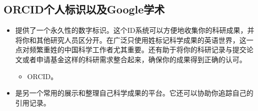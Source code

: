 \documentclass[letterpaper,10pt,english]{sphinxmanual}
\begin{document}
\subsection{ORCID个人标识以及Google学术}
\label{\detokenize{resource/research/getting_started_cn:orcidgoogle}}\begin{itemize}
\item {} 
提供了一个永久性的数字标识。这个ID系统可以方便地收集你的科研成果，并将你和其他研究人员区分开。在广泛只使用姓标记科学成果的英语世界，这一点对频繁重姓的中国科学工作者尤其重要。还有助于将你的科研记录与提交论文或者申请基金这样的科研需求整合起来，确保你的成果得到正确的认可。
\begin{itemize}
\item {} 
ORCID。

\end{itemize}

\item {} 
是另一个常用的展示和整理自己科学成果的平台。它还可以协助你追踪自己的引用记录。

\end{itemize}
\end{document}

